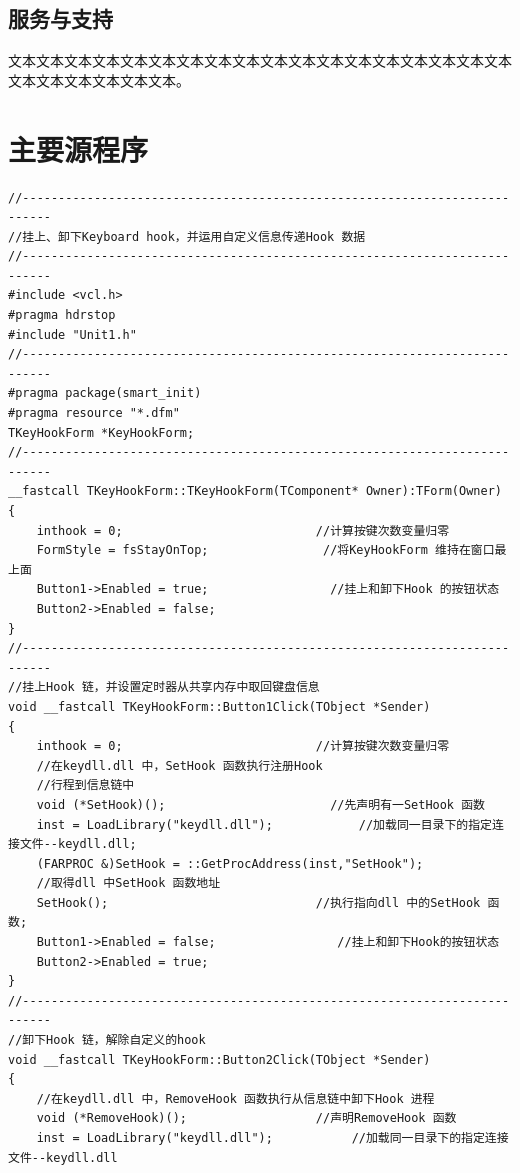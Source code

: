 \documentclass{suse-cs-thesis}
\begin{document}
\section{服务与支持}

文本文本文本文本文本文本文本文本文本文本文本文本文本文本文本文本文本文本文本文本文本文本文本文本。

\chapter{主要源程序}

\begin{verbatim}
//--------------------------------------------------------------------------
//挂上、卸下Keyboard hook，并运用自定义信息传递Hook 数据
//--------------------------------------------------------------------------
#include <vcl.h>
#pragma hdrstop
#include "Unit1.h"
//--------------------------------------------------------------------------
#pragma package(smart_init)
#pragma resource "*.dfm"
TKeyHookForm *KeyHookForm;
//--------------------------------------------------------------------------
__fastcall TKeyHookForm::TKeyHookForm(TComponent* Owner):TForm(Owner)
{
    inthook = 0;                           //计算按键次数变量归零
    FormStyle = fsStayOnTop;                //将KeyHookForm 维持在窗口最上面
    Button1->Enabled = true;                 //挂上和卸下Hook 的按钮状态
    Button2->Enabled = false;
}
//--------------------------------------------------------------------------
//挂上Hook 链，并设置定时器从共享内存中取回键盘信息
void __fastcall TKeyHookForm::Button1Click(TObject *Sender)
{
    inthook = 0;                           //计算按键次数变量归零
    //在keydll.dll 中，SetHook 函数执行注册Hook
    //行程到信息链中
    void (*SetHook)();                       //先声明有一SetHook 函数
    inst = LoadLibrary("keydll.dll");            //加载同一目录下的指定连接文件--keydll.dll;
    (FARPROC &)SetHook = ::GetProcAddress(inst,"SetHook");
    //取得dll 中SetHook 函数地址
    SetHook();                             //执行指向dll 中的SetHook 函数;
    Button1->Enabled = false;                 //挂上和卸下Hook的按钮状态
    Button2->Enabled = true;
}
//--------------------------------------------------------------------------
//卸下Hook 链，解除自定义的hook
void __fastcall TKeyHookForm::Button2Click(TObject *Sender)
{
    //在keydll.dll 中，RemoveHook 函数执行从信息链中卸下Hook 进程
    void (*RemoveHook)();                  //声明RemoveHook 函数
    inst = LoadLibrary("keydll.dll");           //加载同一目录下的指定连接文件--keydll.dll

\end{verbatim}
\end{document}

